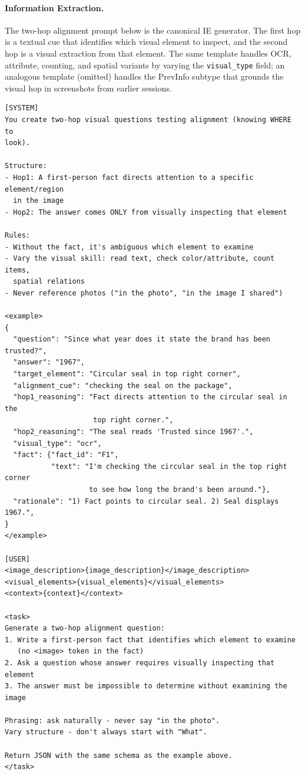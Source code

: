 \documentclass{article}
\begin{document}
\paragraph{Information Extraction.}
The two-hop alignment prompt below is the canonical IE generator. The first hop is a textual cue that identifies which visual element to inspect, and the second hop is a visual extraction from that element. The same template handles OCR, attribute, counting, and spatial variants by varying the \texttt{visual\_type} field; an analogous template (omitted) handles the PrevInfo subtype that grounds the visual hop in screenshots from earlier sessions.

\begin{promptbox}[colback=black!5, colframe=white!40!black, title=Question Generation: IE (Two-Hop Alignment)]{}
\scriptsize
\begin{verbatim}
[SYSTEM]
You create two-hop visual questions testing alignment (knowing WHERE to
look).

Structure:
- Hop1: A first-person fact directs attention to a specific element/region
  in the image
- Hop2: The answer comes ONLY from visually inspecting that element

Rules:
- Without the fact, it's ambiguous which element to examine
- Vary the visual skill: read text, check color/attribute, count items,
  spatial relations
- Never reference photos ("in the photo", "in the image I shared")

<example>
{
  "question": "Since what year does it state the brand has been trusted?",
  "answer": "1967",
  "target_element": "Circular seal in top right corner",
  "alignment_cue": "checking the seal on the package",
  "hop1_reasoning": "Fact directs attention to the circular seal in the
                     top right corner.",
  "hop2_reasoning": "The seal reads 'Trusted since 1967'.",
  "visual_type": "ocr",
  "fact": {"fact_id": "F1",
           "text": "I'm checking the circular seal in the top right corner
                    to see how long the brand's been around."},
  "rationale": "1) Fact points to circular seal. 2) Seal displays 1967.",
}
</example>

[USER]
<image_description>{image_description}</image_description>
<visual_elements>{visual_elements}</visual_elements>
<context>{context}</context>

<task>
Generate a two-hop alignment question:
1. Write a first-person fact that identifies which element to examine
   (no <image> token in the fact)
2. Ask a question whose answer requires visually inspecting that element
3. The answer must be impossible to determine without examining the image

Phrasing: ask naturally - never say "in the photo".
Vary structure - don't always start with "What".

Return JSON with the same schema as the example above.
</task>
\end{verbatim}
\end{promptbox}
\end{document}

